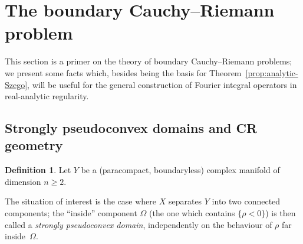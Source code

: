 \documentclass[10pt]{amsart}
\makeatletter
\theoremstyle{definition}\newtheorem{defi}[theo]{Definition}\newtheorem{rema}[theo]{Remark}\newtheorem{exam}[theo]{Example}\newtheorem{exem}[theo]{Example}\newtheorem{nota}[theo]{Notation}
\newcommand\1{\mathds{1}}
\newcommand{\R}{\mathbb{R}}
\newcommand{\dd}{\mathrm{d}}
\let\save@mathaccent\mathaccent
\newcommand*\if@single[3]{%
  \setbox0\hbox{${\mathaccent"0362{#1}}^H$}%
  \setbox2\hbox{${\mathaccent"0362{\kern0pt#1}}^H$}%
  \ifdim\ht0=\ht2 #3\else #2\fi
  }
\newcommand*\rel@kern[1]{\kern#1\dimexpr\macc@kerna}
\newcommand*\widebar[1]{\@ifnextchar^{{\wide@bar{#1}{0}}}{\wide@bar{#1}{1}}}
\newcommand*\wide@bar[2]{\if@single{#1}{\wide@bar@{#1}{#2}{1}}{\wide@bar@{#1}{#2}{2}}}
\newcommand*\wide@bar@[3]{%
  \begingroup
  \def\mathaccent##1##2{%
    \let\mathaccent\save@mathaccent
    \if#32 \let\macc@nucleus\first@char \fi
    \setbox\z@\hbox{$\macc@style{\macc@nucleus}_{}$}%
    \setbox\tw@\hbox{$\macc@style{\macc@nucleus}{}_{}$}%
    \dimen@\wd\tw@
    \advance\dimen@-\wd\z@
    \divide\dimen@ 3
    \@tempdima\wd\tw@
    \advance\@tempdima-\scriptspace
    \divide\@tempdima 10
    \advance\dimen@-\@tempdima
    \ifdim\dimen@>\z@ \dimen@0pt\fi
    \rel@kern{0.6}\kern-\dimen@
    \if#31
      \overline{\rel@kern{-0.6}\kern\dimen@\macc@nucleus\rel@kern{0.4}\kern\dimen@}%
      \advance\dimen@0.4\dimexpr\macc@kerna
      \let\final@kern#2%
      \ifdim\dimen@<\z@ \let\final@kern1\fi
      \if\final@kern1 \kern-\dimen@\fi
    \else
      \overline{\rel@kern{-0.6}\kern\dimen@#1}%
    \fi
  }%
  \macc@depth\@ne
  \let\math@bgroup\@empty \let\math@egroup\macc@set@skewchar
  \mathsurround\z@ \frozen@everymath{\mathgroup\macc@group\relax}%
  \macc@set@skewchar\relax
  \let\mathaccentV\macc@nested@a
  \if#31
    \macc@nested@a\relax111{#1}%
  \else
    \def\gobble@till@marker##1\endmarker{}%
    \futurelet\first@char\gobble@till@marker#1\endmarker
    \ifcat\noexpand\first@char A\else
      \def\first@char{}%
    \fi
    \macc@nested@a\relax111{\first@char}%
  \fi
  \endgroup
}
\let\oldbar\bar
\renewcommand*{\bar}[1]{{\mathchoice{\widebar{#1}}{\widebar{#1}}{\widebar{#1}}{\oldbar{#1}}}}
\renewcommand*{\to}{\mathchoice{\longrightarrow}{\rightarrow}{\rightarrow}{\rightarrow}}
\makeatother
\begin{document}
\section{The boundary Cauchy--Riemann problem}\label{sec:bound-cauchy-riem}

This section is a primer on the theory of boundary Cauchy--Riemann problems; we present some facts which, besides being the basis for Theorem~\ref{prop:analytic-Szego}, will be useful for the general construction of Fourier integral operators in real-analytic regularity.

\subsection{Strongly pseudoconvex domains and CR geometry}\label{sec:strongly-pseud-doma}

\begin{defi}\label{def:pseudoconvex}
Let $Y$ be a (paracompact, boundaryless) complex manifold of
dimension $n\geq 2$.
\end{defi}

The situation of interest is the case where $X$ separates $Y$ into two connected components; the ``inside'' component $\Omega$ (the one which contains $\{\rho<0\}$) is then called a \emph{strongly pseudoconvex domain}, independently on the behaviour of $\rho$ far inside~$\Omega$.
\end{document}
